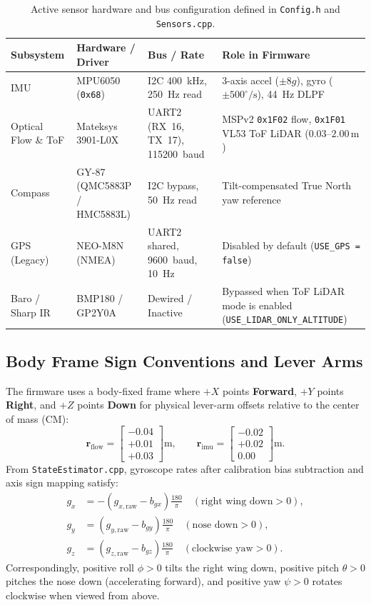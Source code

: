 \documentclass[11pt,a4paper]{article}
\begin{document}
\begin{table}[htbp]
\centering
\small
\begin{tabularx}{\textwidth}{@{}ll>{\raggedright\arraybackslash}p{4.0cm}X@{}}
\toprule
\textbf{Subsystem} & \textbf{Hardware / Driver} & \textbf{Bus / Rate} & \textbf{Role in Firmware} \\
\midrule
IMU & MPU6050 (\texttt{0x68}) & I2C 400~kHz, 250~Hz read & 3-axis accel ($\pm 8g$), gyro ($\pm 500^\circ/\text{s}$), 44~Hz DLPF \\
Optical Flow \& ToF & Mateksys 3901-L0X & UART2 (RX~16, TX~17), 115200~baud & MSPv2 \texttt{0x1F02} flow, \texttt{0x1F01} VL53 ToF LiDAR ($0.03\text{--}2.00\,\text{m}$) \\
Compass & GY-87 (QMC5883P / HMC5883L) & I2C bypass, 50~Hz read & Tilt-compensated True North yaw reference \\
GPS (Legacy) & NEO-M8N (NMEA) & UART2 shared, 9600~baud, 10~Hz & Disabled by default (\texttt{USE\_GPS = false}) \\
Baro / Sharp IR & BMP180 / GP2Y0A & Dewired / Inactive & Bypassed when ToF LiDAR mode is enabled (\texttt{USE\_LIDAR\_ONLY\_ALTITUDE}) \\
\bottomrule
\end{tabularx}
\caption{Active sensor hardware and bus configuration defined in \texttt{Config.h} and \texttt{Sensors.cpp}.}
\label{tab:sensors}
\end{table}

\subsection{Body Frame Sign Conventions and Lever Arms}
The firmware uses a body-fixed frame where $+X$ points \textbf{Forward}, $+Y$ points \textbf{Right}, and $+Z$ points \textbf{Down} for physical lever-arm offsets relative to the center of mass (CM):
\begin{equation}
  \mathbf{r}_{\text{flow}} = \begin{bmatrix} -0.04 \\ +0.01 \\ +0.03 \end{bmatrix}\text{m}, \qquad
  \mathbf{r}_{\text{imu}}  = \begin{bmatrix} -0.02 \\ +0.02 \\ 0.00 \end{bmatrix}\text{m}.
\end{equation}
From \texttt{StateEstimator.cpp}, gyroscope rates after calibration bias subtraction and axis sign mapping satisfy:
\begin{align}
  g_x &= -(g_{x,\text{raw}} - b_{gx})\frac{180}{\pi} \quad(\text{right wing down} > 0), \\
  g_y &=  (g_{y,\text{raw}} - b_{gy})\frac{180}{\pi} \quad(\text{nose down} > 0), \\
  g_z &=  (g_{z,\text{raw}} - b_{gz})\frac{180}{\pi} \quad(\text{clockwise yaw} > 0).
\end{align}
Correspondingly, positive roll $\phi > 0$ tilts the right wing down, positive pitch $\theta > 0$ pitches the nose down (accelerating forward), and positive yaw $\psi > 0$ rotates clockwise when viewed from above.
\end{document}
